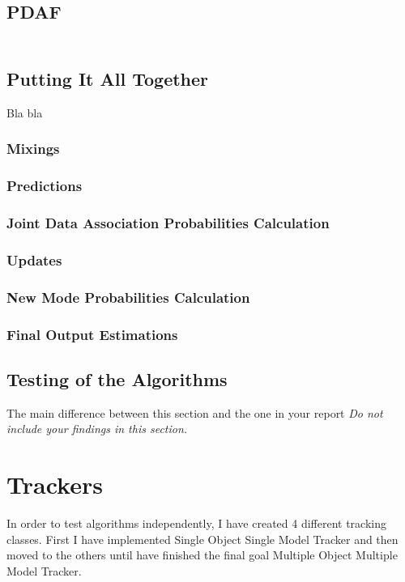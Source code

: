 \documentclass[peerreview]{IEEEtran}
\begin{document}
\subsection{PDAF}
\begin{equation}
\begin{aligned}
\end{aligned}
\end{equation}



\subsection{Putting It All Together}
Bla bla

\subsubsection{Mixings}
\subsubsection{Predictions}
\subsubsection{Joint Data Association Probabilities Calculation}
\subsubsection{Updates}
\subsubsection{New Mode Probabilities Calculation}
\subsubsection{Final Output Estimations}


\subsection{Testing of the Algorithms}
The main difference between this section and the one in your report 
\emph{Do not include your findings in this section.}

\section{Trackers}
In order to test algorithms independently, I have created 4 different tracking classes. First I have implemented Single Object Single Model Tracker and then moved to the others until have finished the final goal Multiple Object Multiple Model Tracker.
\end{document}
